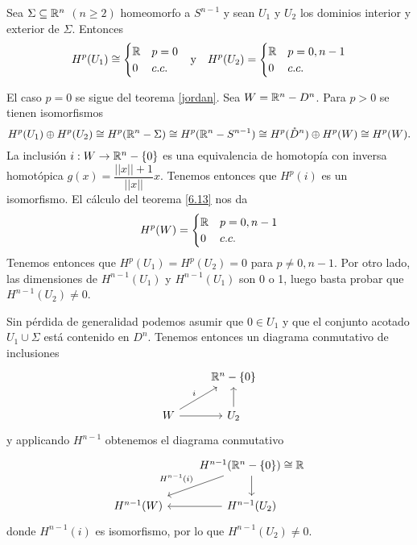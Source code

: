 \documentclass[CV.tex]{subfiles}
\begin{document}
\begin{prop}
Sea $\Sigma\subseteq\mathbb{R}^n$ $(n\geq 2)$ homeomorfo a $S^{n-1}$ y sean $U_1$ y $U_2$ los dominios interior y exterior de $\Sigma$. Entonces
\begin{align*}
&H^p(U_1)\cong \begin{cases}
\mathbb{R} & p=0\\
0 & c.c.
\end{cases} &\text{y}& & H^p(U_2)=\begin{cases}
\mathbb{R} & p=0,n-1\\
0 & c.c.
\end{cases}
\end{align*}
\end{prop}
\begin{dem}
El caso $p=0$ se sigue del teorema \ref{jordan}. Sea $W=\mathbb{R}^n-D^n$. Para $p>0$ se tienen isomorfismos
\[
H^p(U_1)\oplus H^p(U_2)\cong H^p(\mathbb{R}^n-\Sigma)\cong H^p(\mathbb{R}^n-S^{n-1})\cong H^p(\mathring{D}^n)\oplus H^p(W)\cong H^p(W).
\]
La inclusión $i:W\to\mathbb{R}^n-\{0\}$ es una equivalencia de homotopía con inversa homotópica $g(x)=\dfrac{||x||+1}{||x||}x$. Tenemos entonces que $H^p(i)$ es un isomorfismo. El cálculo del teorema \ref{6.13} nos da
\[
H^p(W)=\begin{cases}
\mathbb{R} & p=0,n-1\\
0 & c.c.
\end{cases}
\]
Tenemos entonces que $H^p(U_1)=H^p(U_2)=0$ para $p\neq 0, n-1$. Por otro lado, las dimensiones de $H^{n-1}(U_1)$ y $H^{n-1}(U_1)$ son 0 o 1, luego basta probar que $H^{n-1}(U_2)\neq 0$. 

Sin pérdida de generalidad podemos asumir que $0\in U_1$ y que el conjunto acotado $U_1\cup\Sigma$ está contenido en $D^n$. Tenemos entonces un diagrama conmutativo de inclusiones
\[
\begin{tikzcd}
& \R^n-\{0\}\\
W\arrow[ur, "i"]\arrow[r] & U_2\arrow[u]
\end{tikzcd}
\]
y applicando $H^{n-1}$ obtenemos el diagrama conmutativo
\[
\begin{tikzcd}
& H^{n-1}(\R^n-\{0\})\cong\R\arrow[dl, "H^{n-1}(i)"']\arrow[d]\\
H^{n-1}(W)& H^{n-1}(U_2)\arrow[l] 
\end{tikzcd}
\]
donde $H^{n-1}(i)$ es isomorfismo, por lo que $H^{n-1}(U_2)\neq 0$.
\QED
\end{dem}

\begin{ej}
\end{ej}
\end{document}
